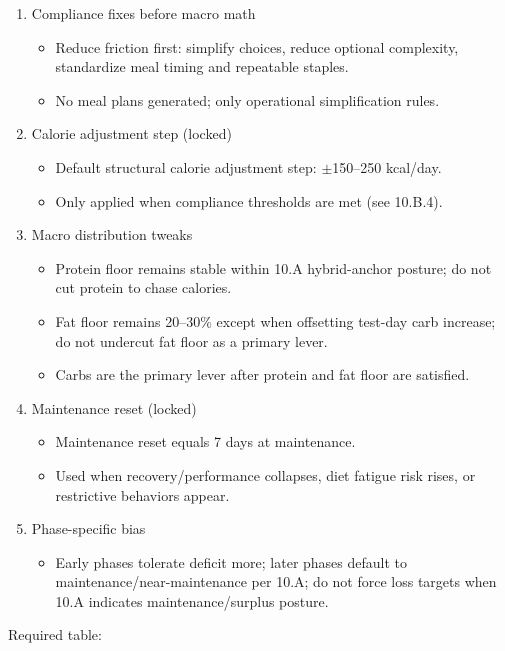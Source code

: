 \documentclass[10pt]{article}
\begin{document}
\begin{enumerate}
\item Compliance fixes before macro math
\begin{itemize}
\item Reduce friction first: simplify choices, reduce optional complexity, standardize meal timing and repeatable staples.
\item No meal plans generated; only operational simplification rules.
\end{itemize}
\item Calorie adjustment step (locked)
\begin{itemize}
\item Default structural calorie adjustment step: $\pm$150–250 kcal/day.
\item Only applied when compliance thresholds are met (see 10.B.4).
\end{itemize}
\item Macro distribution tweaks
\begin{itemize}
\item Protein floor remains stable within 10.A hybrid-anchor posture; do not cut protein to chase calories.
\item Fat floor remains 20–30\% except when offsetting test-day carb increase; do not undercut fat floor as a primary lever.
\item Carbs are the primary lever after protein and fat floor are satisfied.
\end{itemize}
\item Maintenance reset (locked)
\begin{itemize}
\item Maintenance reset equals 7 days at maintenance.
\item Used when recovery/performance collapses, diet fatigue risk rises, or restrictive behaviors appear.
\end{itemize}
\item Phase-specific bias
\begin{itemize}
\item Early phases tolerate deficit more; later phases default to maintenance/near-maintenance per 10.A; do not force loss targets when 10.A indicates maintenance/surplus posture.
\end{itemize}
\end{enumerate}

Required table:

\begingroup
\scriptsize
\setlength{\tabcolsep}{2pt}
\renewcommand{\arraystretch}{1.12}
\end{document}
